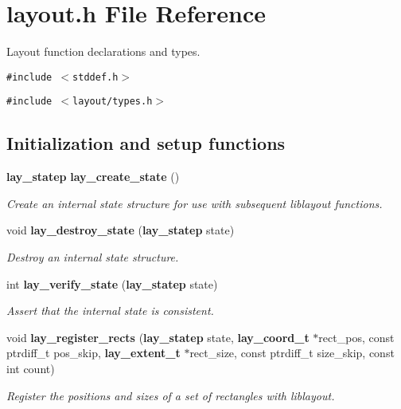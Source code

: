 \section{layout.h File Reference}
\label{layout_8h}
Layout function declarations and types.  


{\tt \#include $<$stddef.h$>$}\par
{\tt \#include $<$layout/types.h$>$}\par
\subsection*{Initialization and setup functions}
\begin{CompactItemize}
\item 
{\bf lay\_\-statep} {\bf lay\_\-create\_\-state} ()
\begin{CompactList}\small\item\em Create an internal state structure for use with subsequent liblayout functions. \item\end{CompactList}\item 
void {\bf lay\_\-destroy\_\-state} ({\bf lay\_\-statep} state)\label{layout_8h_a2}

\begin{CompactList}\small\item\em Destroy an internal state structure. \item\end{CompactList}\item 
int {\bf lay\_\-verify\_\-state} ({\bf lay\_\-statep} state)\label{layout_8h_a3}

\begin{CompactList}\small\item\em Assert that the internal state is consistent. \item\end{CompactList}\item 
void {\bf lay\_\-register\_\-rects} ({\bf lay\_\-statep} state, {\bf lay\_\-coord\_\-t} $\ast$rect\_\-pos, const  ptrdiff\_\-t pos\_\-skip, {\bf lay\_\-extent\_\-t} $\ast$rect\_\-size, const  ptrdiff\_\-t size\_\-skip, const  int count)
\begin{CompactList}\small\item\em Register the positions and sizes of a set of rectangles with liblayout. \item\end{CompactList}\end{CompactItemize}

